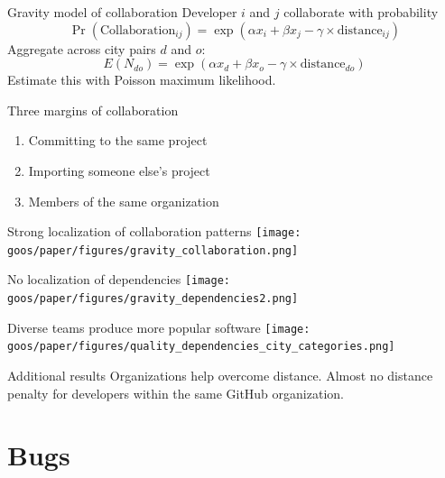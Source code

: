\documentclass[
  ignorenonframetext,
  aspectratio=1610,
]{beamer}
\providecommand{\tightlist}{%
  \setlength{\itemsep}{0pt}\setlength{\parskip}{0pt}}
\begin{document}
\begin{frame}{Gravity model of collaboration}
\label{gravity-model-of-collaboration}
Developer \(i\) and \(j\) collaborate with probability \[
\Pr(\text{Collaboration}_{ij}) = \exp(\alpha x_i + \beta x_j -\gamma\times\text{distance}_{ij})
\] Aggregate across city pairs \(d\) and \(o\): \[
E(N_{do}) = \exp(\alpha x_d + \beta x_o -\gamma\times\text{distance}_{do})
\] Estimate this with Poisson maximum likelihood.
\end{frame}

\begin{frame}{Three margins of collaboration}
\label{three-margins-of-collaboration}
\begin{enumerate}
\tightlist
\item
  Committing to the same project
\item
  Importing someone else's project
\item
  Members of the same organization
\end{enumerate}
\end{frame}

\begin{frame}{Strong localization of collaboration patterns}
\label{strong-localization-of-collaboration-patterns}
\texttt{[image: goos/paper/figures/gravity\_collaboration.png]}
\end{frame}

\begin{frame}{No localization of dependencies}
\label{no-localization-of-dependencies}
\texttt{[image: goos/paper/figures/gravity\_dependencies2.png]}
\end{frame}

\begin{frame}{Diverse teams produce more popular software}
\label{diverse-teams-produce-more-popular-software}
\texttt{[image: goos/paper/figures/quality\_dependencies\_city\_categories.png]}
\end{frame}

\begin{frame}{Additional results}
\label{additional-results}
Organizations help overcome distance. Almost no distance penalty for
developers within the same GitHub organization.
\end{frame}

\section{\texorpdfstring{Bugs }{Bugs }}\label{bugs-1}
\end{document}
